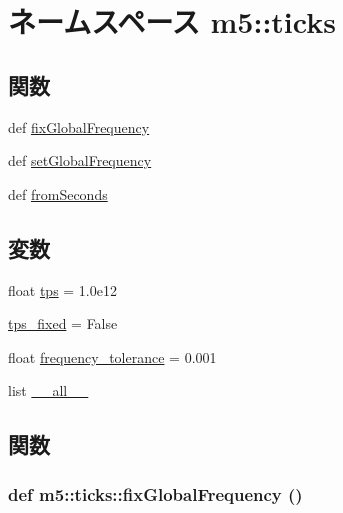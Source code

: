 \hypertarget{namespacem5_1_1ticks}{
\section{ネームスペース m5::ticks}
\label{namespacem5_1_1ticks}
}
\subsection*{関数}
\begin{DoxyCompactItemize}
\item 
def \hyperlink{namespacem5_1_1ticks_a4b96fedcec7b9876e1e3f808c616988c}{fixGlobalFrequency}
\item 
def \hyperlink{namespacem5_1_1ticks_a175a2a93d9b8a10666cabe70ddc8fe56}{setGlobalFrequency}
\item 
def \hyperlink{namespacem5_1_1ticks_a8beea6a5babd1b8a0975e69ed7bd99b9}{fromSeconds}
\end{DoxyCompactItemize}
\subsection*{変数}
\begin{DoxyCompactItemize}
\item 
float \hyperlink{namespacem5_1_1ticks_a3bc8cac19cc66d1cfe3b0aeba6299271}{tps} = 1.0e12
\item 
\hyperlink{namespacem5_1_1ticks_af6ce746b7d1156b95ebd9c32b09d693a}{tps\_\-fixed} = False
\item 
float \hyperlink{namespacem5_1_1ticks_ab05a03249670abb258a9dd7c2a435443}{frequency\_\-tolerance} = 0.001
\item 
list \hyperlink{namespacem5_1_1ticks_aa4a022e6ddacd362b83964da5cc5d044}{\_\-\_\-all\_\-\_\-}
\end{DoxyCompactItemize}


\subsection{関数}
\hypertarget{namespacem5_1_1ticks_a4b96fedcec7b9876e1e3f808c616988c}{
\subsubsection[{fixGlobalFrequency}]{\setlength{\rightskip}{0pt plus 5cm}def m5::ticks::fixGlobalFrequency ()}}
\label{namespacem5_1_1ticks_a4b96fedcec7b9876e1e3f808c616988c}




